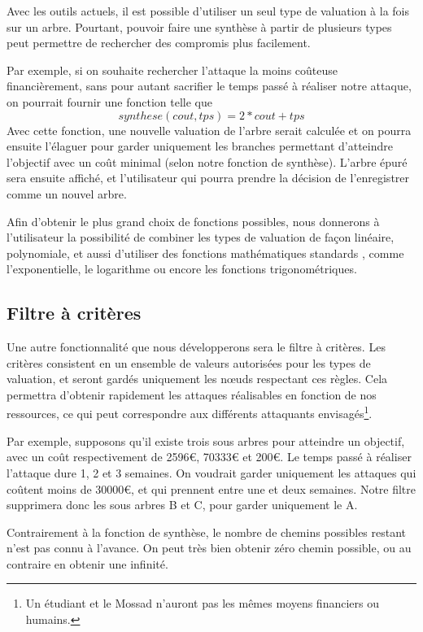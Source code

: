         Avec les outils actuels, il est possible d'utiliser un seul type de valuation à la fois sur un arbre. Pourtant, pouvoir faire une synthèse à partir de plusieurs types peut permettre de rechercher des compromis plus facilement.

        Par exemple, si on souhaite rechercher l'attaque la moins coûteuse financièrement, sans pour autant sacrifier le temps passé à réaliser notre attaque, on pourrait fournir une fonction telle que \[ synthese(cout, tps) = 2*cout + tps \] 
        Avec cette fonction, une nouvelle valuation de l'arbre serait calculée et on pourra ensuite l'élaguer pour garder uniquement les branches permettant d'atteindre l'objectif avec un coût minimal (selon notre fonction de synthèse). 
        L'arbre épuré sera ensuite affiché, et l'utilisateur qui pourra prendre la décision de l'enregistrer comme un nouvel arbre.

        Afin d'obtenir le plus grand choix de fonctions possibles, nous donnerons à l'utilisateur la possibilité de combiner les types de valuation de façon linéaire, polynomiale, et aussi d'utiliser des fonctions mathématiques \og standards \fg, comme l'exponentielle, le logarithme ou encore les fonctions trigonométriques.

    \subsection{Filtre à critères}
        \label{sec:filtre}

        Une autre fonctionnalité que nous développerons sera le filtre à critères. Les critères consistent en un ensemble de valeurs autorisées pour les types de valuation, et seront gardés uniquement les nœuds respectant ces règles. Cela permettra d'obtenir rapidement les attaques réalisables en fonction de nos ressources, ce qui peut correspondre aux différents attaquants envisagés\footnote{Un étudiant et le Mossad n'auront pas les mêmes moyens financiers ou humains.}.

        Par exemple, supposons qu'il existe trois sous arbres pour atteindre un objectif, avec un coût respectivement de 2596\euro{}, 70333\euro{} et 200\euro{}. Le temps passé à réaliser l'attaque dure 1, 2 et 3 semaines. On voudrait garder uniquement les attaques qui coûtent moins de 30000\euro{}, et qui prennent entre une et deux semaines. Notre filtre supprimera donc les sous arbres B et C, pour garder uniquement le A.

        Contrairement à la fonction de synthèse, le nombre de chemins possibles restant n'est pas connu à l'avance. On peut très bien obtenir zéro chemin possible, ou au contraire en obtenir une infinité.

